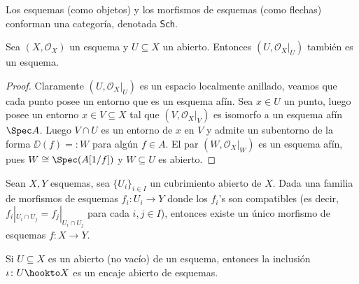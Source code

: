 \begin{prop}
	Los esquemas (como objetos) y los morfismos de esquemas (como flechas) conforman una categoría, denotada $\mathsf{Sch}$.
\end{prop}
\begin{prop}
	Sea $(X, \mathscr{O}_X)$ un esquema y $U \subseteq X$ un abierto. Entonces $(U, \mathscr{O}_X|_U )$ también es un esquema.
\end{prop}
\begin{proof}
	Claramente $(U, \mathscr{O}_X|_U )$ es un espacio localmente anillado, veamos que cada punto posee un entorno que es un esquema afín.
	Sea $x \in U$ un punto, luego posee un entorno $x \in V \subseteq X$ tal que $(V, \mathscr{O}_X|_V )$ es isomorfo a un esquema afín $\Spec A$.
	Luego $V \cap U$ es un entorno de $x$ en $V$ y admite un subentorno de la forma $\DD(f ) =: W$ para algún $f \in A$.
	El par $(W, \mathscr{O}_X|_W)$ es un esquema afín, pues $W \cong \Spec(A[1/f ])$ y $W \subseteq U$ es abierto.
\end{proof}

\begin{prop}\label{thm:compatible_morphs_glue}
	Sean $X, Y$ esquemas, sea $\{ U_i \}_{i\in I}$ un cubrimiento abierto de $X$.
	Dada una familia de morfismos de esquemas $f_i \colon U_i \to Y$ donde los $f_i$'s son compatibles
	(es decir, $f_i|_{U_i \cap U_j} = f_j|_{U_i \cap U_j}$ para cada $i, j \in I$), entonces existe un único morfismo de esquemas $f \colon X \to Y$.
\end{prop}
\begin{cor}
	Si $U \subseteq X$ es un abierto (no vacío) de un esquema, entonces la inclusión $\iota \colon U \hookto X$ es un encaje abierto de esquemas.
\end{cor}

